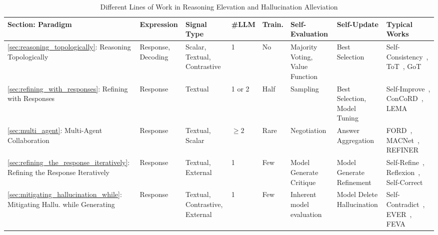 \documentclass[lettersize,journal]{IEEEtran}
\begin{document}
\begin{table}[h!]
\begin{threeparttable}

\caption{Different Lines of Work in Reasoning Elevation and Hallucination Alleviation}
\label{tab:reason_hall_paradigms}
\scriptsize
\begin{tabular}{p{2.4cm}p{1.3cm}p{2.1cm}p{0.8cm}p{0.5cm}p{1.65cm}p{1.5cm}p{3.85cm}}
\toprule
\textbf{Section: Paradigm}  &  \textbf{Expression}     & \textbf{Signal Type}                    & \textbf{\#LLM}  &\textbf{Train.} & \textbf{Self-Evaluation}                     & \textbf{Self-Update}                   & \textbf{Typical Works}                        \\
\midrule
\ref{sec:reasoning_topologically}: Reasoning Topologically                  & Response, \newline Decoding & Scalar, Textual, \newline Contrastive   & 1      & No         & Majority Voting, Value Function & Best Selection                & Self-Consistency~\cite{SelfConsistency_23_ICLR_Google}, ToT~\cite{ToT_23_NeuIPS_Princeton}, GoT~\cite{GoT_24_AAAI_ETH}           \\
\midrule
\ref{sec:refining_with_responses}: Refining with Responses                  & Response            & Textual                        & 1 or 2 & Half            & Sampling                            & Best Selection, Model Tuning & Self-Improve~\cite{SelfImprove_23_EMNLP_Illinois}, ConCoRD~\cite{ConCoRD_22_EMNLP_Stanford}, LEMA~\cite{LearnMistake_24_arXiv_MS}          \\
\midrule
\ref{sec:multi_agent}: Multi-Agent Collaboration                             & Response            & Textual, Scalar                & $\geq 2$     & Rare   & Negotiation                         & Answer Aggregation            & FORD~\cite{ModalCollaboration_23_EMNLP_HIT}, MACNet~\cite{MACNet_24_arXiv_THU}, REFINER~\cite{REFINER_24_EACL_EPFL}                \\
\midrule
\midrule
\ref{sec:refining_the_response_iteratively}: Refining the Response Iteratively        & Response            & Textual, External              & 1      & Few           & Model Generate Critique             & Model Generate Refinement     & Self-Refine~\cite{SelfRefine_23_NeuIPS_CMU}, Reflexion~\cite{Reflexion_23_NeuIPS_Northeastern}, Self-Correct~\cite{SelfCorrect_23_ICLR_AI2} \\
\midrule
\ref{sec:mitigating_hallucination_while}: Mitigating Hallu. while Generating & Response            & Textual, Contrastive, \newline External & 1      & Few            & Inherent model evaluation           & Model Delete Hallucination    & Self-Contradict~\cite{HalluSelfContradictory_24_ICLR_ETH}, EVER~\cite{EVER_arXiv_23_UNC}, FEVA~\cite{FAVA_24_arXiv_Washington}       \\

\end{tabular}
\end{threeparttable}
\end{table}
\end{document}
